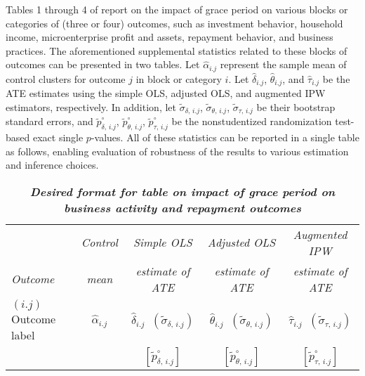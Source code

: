 \documentclass[12pt]{article}
\begin{document}
Tables 1 through 4 of \cite{field2013does} report on the impact of grace period on various blocks or categories of (three or four) outcomes, such as investment behavior, household income, microenterprise profit and assets, repayment behavior, and business practices. The aforementioned supplemental statistics related to these blocks of outcomes can be presented in two tables. Let $\widehat{\alpha}_{i.j}$ represent the sample mean of control clusters for outcome $j$ in block or category $i$. Let $\widehat{\delta}_{i.j}$, $\widehat{\theta}_{i.j}$, and $\widehat{\tau}_{i.j}$ be the ATE estimates using the simple OLS, adjusted OLS, and augmented IPW estimators, respectively. In addition, let $\widetilde{\sigma}_{\delta,\,i.j}$, $\widetilde{\sigma}_{\theta,\,i.j}$, $\widetilde{\sigma}_{\tau,\,i.j}$ be their bootstrap standard errors, and $\tilde{p}^\circ_{\delta,\,i.j}$, $\tilde{p}^\circ_{\theta,\,i.j}$, $\tilde{p}^\circ_{\tau,\,i.j}$ be the nonstudentized randomization test-based exact single $p$-values. All of these statistics can be reported in a single table as follows, enabling evaluation of robustness of the results to various estimation and inference choices.

\begin{table}[!ht]
\begin{center}
\caption*{\textbf{\textit{Desired format for table on impact of grace period on business activity and repayment outcomes}}}
\label{table:table_format_single_pvals}
\footnotesize
{}
\begin{tabular}{l|c@{\hskip 10pt}|c@{\hskip 10pt}|c@{\hskip 10pt}|c}
\hline\hline
 & \textit{Control} & \textit{Simple OLS} & \textit{Adjusted OLS} & \textit{Augmented IPW} \\ [-1mm]
 \textit{Outcome} & \textit{mean} & \textit{estimate of ATE} & \textit{estimate of ATE} & \textit{estimate of ATE} \\ \hline \hline
 $ (i.j) $ Outcome label & $ \widehat{\alpha}_{i.j} $  & $ \widehat{\delta}_{i.j} \;\; ( \widetilde{\sigma}_{\delta,\,i.j} ) $  & $ \widehat{\theta}_{i.j} \;\; ( \widetilde{\sigma}_{\theta,\,i.j} ) $  & $ \widehat{\tau}_{i.j} \;\; ( \widetilde{\sigma}_{\tau,\,i.j} ) $ \\ [-1mm]
 &  & $ [\tilde{p}^\circ_{\delta,\,i.j}] $ & $ [\tilde{p}^\circ_{\theta,\,i.j}] $ & $ [\tilde{p}^\circ_{\tau,\,i.j}] $ \\ \hline\hline
\end{tabular}
\end{center}
\end{table}
\end{document}
